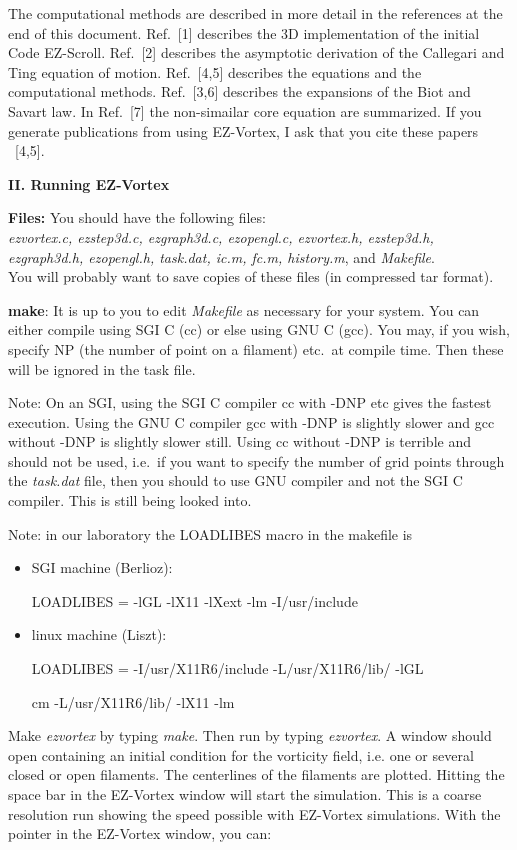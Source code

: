 The computational methods are described in more detail in the
references at the end of this document.  Ref.~[1] describes the 3D
implementation of the initial Code EZ-Scroll.  Ref.~[2] describes the asymptotic derivation of the Callegari and Ting equation of motion. Ref.~[4,5] describes the equations and the computational  methods. Ref.~[3,6] describes the expansions of the Biot and Savart law.  In Ref.~[7] the non-simailar core equation are summarized. If you generate publications from using EZ-Vortex, I ask that you cite these papers ~[4,5].


\medskip
{\bf II. Running EZ-Vortex} 
\smallskip

{\bf Files:} You should have the following files: \\ {\em ezvortex.c,
ezstep3d.c, ezgraph3d.c, ezopengl.c, ezvortex.h, ezstep3d.h,
ezgraph3d.h, ezopengl.h, task.dat, ic.m, fc.m, history.m}, and {\em Makefile}. \\ You will
probably want to save copies of these files (in compressed tar
format).

{\bf make}: It is up to you to edit {\em Makefile} as necessary for
your system. You can either compile using SGI C (cc) or else using GNU
C (gcc).  You may, if you wish, specify NP (the number of point on a filament) etc.~at compile time.  Then
these will be ignored in the task file.

Note: On an SGI, using the SGI C compiler cc with -DNP etc gives the
fastest execution.  Using the GNU C compiler gcc with -DNP is slightly
slower and gcc without -DNP is slightly slower still.  Using cc
without -DNP is terrible and should not be used, i.e.~if you want to
specify the number of grid points through the {\em task.dat} file,
then you should to use GNU compiler and not the SGI C compiler.  This
is still being looked into.

Note: in our laboratory  the LOADLIBES macro in the makefile is
\begin{itemize} 
   \item SGI machine (Berlioz):

LOADLIBES = -lGL -lX11 -lXext -lm   -I/usr/include 
 \item linux machine (Liszt):

LOADLIBES = -I/usr/X11R6/include -L/usr/X11R6/lib/ -lGL 

 cm -L/usr/X11R6/lib/ -lX11  -lm 
\end{itemize}

Make {\em ezvortex} by typing {\em make}. Then run by typing {\em
ezvortex}. A window should open containing an initial condition for the vorticity field, i.e. one or several closed or open filaments. The  centerlines of the filaments are plotted.  Hitting the space bar in the EZ-Vortex window will
start the simulation. This is a coarse resolution run showing the
speed possible with EZ-Vortex simulations.  With the pointer in the
EZ-Vortex window, you can:

